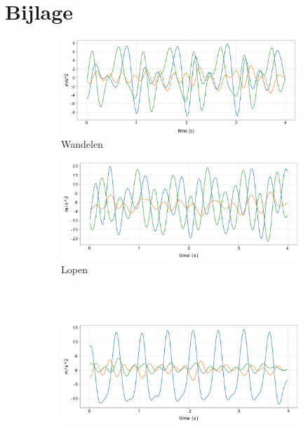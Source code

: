 \documentclass{article}
\begin{document}




\clearpage
\newpage

\section{Bijlage}
\begin{figure}
\centering

  \begin{subfigure}[b]{.49\linewidth}
    \centering
    \includegraphics[width=0.99\textwidth]{figures/wandelen}
    \caption{Wandelen}\label{fig:1a}
  \end{subfigure}%
  \begin{subfigure}[b]{.49\linewidth}
    \centering
    \includegraphics[width=.99\textwidth]{figures/lopen}
    \caption{Lopen}\label{fig:1b}
  \end{subfigure} \\~\\
  \begin{subfigure}[b]{.49\linewidth}
    \centering
    \includegraphics[width=.99\textwidth]{figures/springen}

\end{subfigure}
\end{figure}
\end{document}
